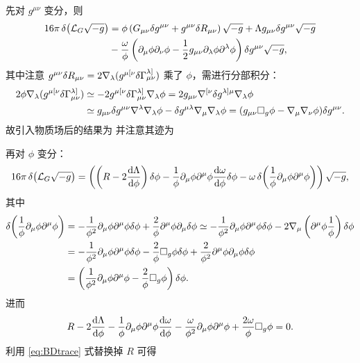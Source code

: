先对 $g^{\mu\nu}$ 变分，则
\begin{align*}
    16\pi \var(\mathcal{L}_G\sqrt{-g})&=\phi\left( G_{\mu\nu} \var g^{\mu\nu}+g^{\mu\nu}\var R_{\mu\nu}\right) \sqrt{-g}+ \Lambda g_{\mu\nu} \var g^{\mu\nu}\sqrt{-g}\\
&-\frac{\omega}{\phi}\left(\partial_\mu\phi \partial_\nu\phi-\frac 12 g_{\mu\nu}\partial_\lambda \phi \partial^\lambda\phi\right)\var g^{\mu\nu}\sqrt{-g},
\end{align*}
其中注意 $g^{\mu\nu}\var R_{\mu\nu}=2\nabla_\lambda(g^{\mu [\nu} \delta \Gamma_{\mu \nu}^{\lambda]})$ 乘了 $\phi$，需进行分部积分：
\begin{align*}
    2 \phi \nabla_\lambda(g^{\mu [\nu} \delta \Gamma_{\mu \nu}^{\lambda]}) &\simeq -2  g^{\mu [\nu} \delta \Gamma_{\mu \nu}^{\lambda]} \nabla_\lambda \phi = 2 g_{\mu\nu}\nabla^{[\nu} \delta g^{\lambda]\mu} \nabla_\lambda \phi \\
    &\simeq g_{\mu\nu} \delta g^{\mu\nu}\nabla^\lambda \nabla_\lambda \phi - \delta g^{\mu\lambda} \nabla_\mu\nabla_\lambda \phi = (g_{\mu\nu} \square_g \phi - \nabla_\mu\nabla_\nu \phi) \delta g^{\mu\nu}.
\end{align*}
故引入物质场后的结果为
并注意其迹为

再对 $\phi$ 变分：
\[16\pi\var(\mathcal{L}_G\sqrt{-g})= \left(\left(R-2\dv{\Lambda}{\phi}\right)\var\phi - \frac{1}{\phi}\partial_\mu \phi \partial^\mu \phi\dv{\omega}{\phi}\var\phi - \omega\var(\frac{1}{\phi}\partial_\mu \phi \partial^\mu \phi)\right) \sqrt{-g},\]
其中
\begin{align*}
    \var(\frac{1}{\phi}\partial_\mu \phi \partial^\mu \phi) 
    & = -\frac{1}{\phi^2} \partial_\mu \phi \partial^\mu \phi \var\phi+\frac{2}{\phi} \partial^\mu \phi  \partial_\mu \var\phi \simeq -\frac{1}{\phi^2} \partial_\mu \phi \partial^\mu \phi \var\phi-2 \nabla_\mu\left(\partial^\mu \phi \frac{1}{\phi}\right) \var\phi \\
    & = -\frac{1}{\phi^2} \partial_\mu \phi \partial^\mu \phi \var\phi-\frac{2}{\phi} \square_g \phi \var\phi+\frac{2}{\phi^2} \partial^\mu \phi \partial_\mu \phi \var\phi \\
    & = \left(\frac{1}{\phi^2} \partial_\mu \phi \partial^\mu \phi  - \frac{2}{\phi} \square_g \phi \right)\var\phi .
\end{align*}
进而
\[
    R-2\dv{\Lambda}{\phi}-\frac{1}{\phi}\partial_\mu \phi \partial^\mu \phi\dv{\omega}{\phi}- \frac{\omega}{\phi^2} \partial_\mu \phi \partial^\mu \phi  + \frac{2\omega}{\phi} \square_g \phi=0.
\]
利用 \eqref{eq:BDtrace} 式替换掉 $R$ 可得

